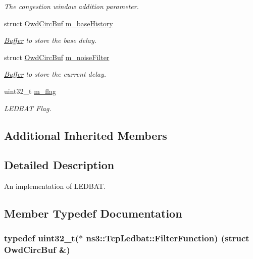 \begin{DoxyCompactItemize}
\begin{DoxyCompactList}\small\item\em The congestion window addition parameter. \end{DoxyCompactList}\item 
struct \hyperlink{structns3_1_1TcpLedbat_1_1OwdCircBuf}{Owd\+Circ\+Buf} \hyperlink{classns3_1_1TcpLedbat_a26c9974e30e4cacc5e57613c2014445f}{m\+\_\+base\+History}
\begin{DoxyCompactList}\small\item\em \hyperlink{classns3_1_1Buffer}{Buffer} to store the base delay. \end{DoxyCompactList}\item 
struct \hyperlink{structns3_1_1TcpLedbat_1_1OwdCircBuf}{Owd\+Circ\+Buf} \hyperlink{classns3_1_1TcpLedbat_a03ed887c2d0b9b02d50246759e31fe14}{m\+\_\+noise\+Filter}
\begin{DoxyCompactList}\small\item\em \hyperlink{classns3_1_1Buffer}{Buffer} to store the current delay. \end{DoxyCompactList}\item 
uint32\+\_\+t \hyperlink{classns3_1_1TcpLedbat_a2ff0d8e9f3fe47a1a589738f770ab00d}{m\+\_\+flag}
\begin{DoxyCompactList}\small\item\em L\+E\+D\+B\+AT Flag. \end{DoxyCompactList}\end{DoxyCompactItemize}
\subsection*{Additional Inherited Members}


\subsection{Detailed Description}
An implementation of L\+E\+D\+B\+AT. 

\subsection{Member Typedef Documentation}
\subsubsection[{\texorpdfstring{Filter\+Function}{FilterFunction}}]{\setlength{\rightskip}{0pt plus 5cm}typedef uint32\+\_\+t($\ast$ ns3\+::\+Tcp\+Ledbat\+::\+Filter\+Function) (struct {\bf Owd\+Circ\+Buf} \&)\hspace{0.3cm}{\ttfamily [private]}}\hypertarget{classns3_1_1TcpLedbat_a44a96f49fc459cec6e691e2d04f56a03}{}\label{classns3_1_1TcpLedbat_a44a96f49fc459cec6e691e2d04f56a03}


